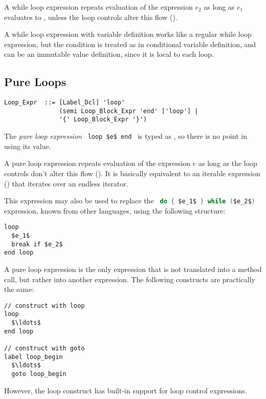 A while loop expression repeats evaluation of the expression $e_2$ as long as $e_1$ evaluates to , unless the loop controls alter this flow ().

A while loop expression with variable definition works like a regular while loop expression, but the condition is treated as in conditional variable definition, and can be an immutable value definition, since it is local to each loop. 





\subsection{Pure Loops}
\label{sec:pure-loops}

\syntax\begin{lstlisting}
Loop_Expr  ::= [Label_Dcl] 'loop'
               (semi Loop_Block_Expr 'end' ['loop'] | 
               '{' Loop_Block_Expr '}')
\end{lstlisting}

The {\em pure loop expression} ~\lstinline!loop $e$ end!~ is typed as , so there is no point in using its value. 

A pure loop expression repeats evaluation of the expression $e$ as long as the loop controls don't alter this flow (). It is basically equivalent to an iterable expression () that iterates over an endless iterator. 

This expression may also be used to replace the ~\lstinline[language=Java]!do { $e_1$ } while ($e_2$)!~ expression, known from other languages, using the following structure: 
\begin{lstlisting}
loop
  $e_1$
  break if $e_2$
end loop
\end{lstlisting}

A pure loop expression is the only expression that is not translated into a method call, but rather into another expression. The following constructs are practically the same: 
\begin{lstlisting}
// construct with loop
loop
  $\ldots$
end loop

// construct with goto
label loop_begin
  $\ldots$
  goto loop_begin
\end{lstlisting}
However, the loop construct has built-in support for loop control expressions. 





